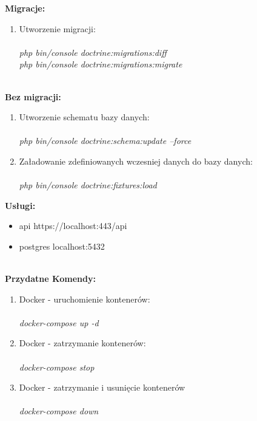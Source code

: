 \documentclass{article}
\begin{document}
\textbf{Migracje:}\\
\begin{enumerate}
\item Utworzenie migracji: \\\\
 \emph{php bin/console doctrine:migrations:diff} \\
 \emph{php bin/console doctrine:migrations:migrate} \\\\
  \end{enumerate}
 \textbf{Bez migracji:}\\
 \begin{enumerate}
\item Utworzenie schematu bazy danych: \\\\
 \emph{php bin/console doctrine:schema:update --force} \\
 \item Załadowanie zdefiniowanych wczesniej danych do bazy danych: \\\\
 \emph{php bin/console doctrine:fixtures:load} \\
 \end{enumerate}






\textbf{Usługi:}
    \begin{itemize}
        \item api https://localhost:443/api
        \item postgres localhost:5432 \\\\
    \end{itemize}
    
    
   
\textbf{Przydatne Komendy:}\\
\begin{enumerate}
\item Docker - uruchomienie kontenerów: \\\\
 \emph{docker-compose up -d} \\
 \item Docker - zatrzymanie kontenerów: \\\\
 \emph{docker-compose stop} \\
 \item Docker - zatrzymanie i usunięcie kontenerów \\\\
 \emph{docker-compose down} \\
  \end{enumerate}
    
\end{document}

